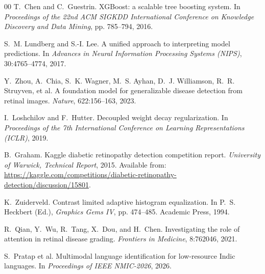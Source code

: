 \documentclass[review,12pt]{elsarticle}
\begin{document}
\begin{thebibliography}{00}
T.~Chen and C.~Guestrin.
\newblock XGBoost: a scalable tree boosting system.
\newblock In \textit{Proceedings of the 22nd ACM SIGKDD International
Conference on Knowledge Discovery and Data Mining}, pp. 785--794, 2016.

S.~M. Lundberg and S.-I. Lee.
\newblock A unified approach to interpreting model predictions.
\newblock In \textit{Advances in Neural Information Processing Systems
(NIPS)}, 30:4765--4774, 2017.

Y.~Zhou, A.~Chia, S.~K. Wagner, M.~S. Ayhan, D.~J. Williamson,
R.~R. Struyven, et al.
\newblock A foundation model for generalizable disease detection from retinal
images.
\newblock \textit{Nature}, 622:156--163, 2023.

I.~Loshchilov and F.~Hutter.
\newblock Decoupled weight decay regularization.
\newblock In \textit{Proceedings of the 7th International Conference on
Learning Representations (ICLR)}, 2019.

B.~Graham.
\newblock Kaggle diabetic retinopathy detection competition report.
\newblock \textit{University of Warwick, Technical Report}, 2015.
\newblock Available from: \url{https://kaggle.com/competitions/diabetic-retinopathy-detection/discussion/15801}.

K.~Zuiderveld.
\newblock Contrast limited adaptive histogram equalization.
\newblock In P.~S. Heckbert (Ed.), \textit{Graphics Gems IV}, pp. 474--485.
Academic Press, 1994.

R.~Qian, Y.~Wu, R.~Tang, X.~Dou, and H.~Chen.
\newblock Investigating the role of attention in retinal disease grading.
\newblock \textit{Frontiers in Medicine}, 8:762046, 2021.

S.~Pratap et al.
\newblock Multimodal language identification for low-resource Indic languages.
\newblock In \textit{Proceedings of IEEE NMIC-2026}, 2026.

\end{thebibliography}
\end{document}
